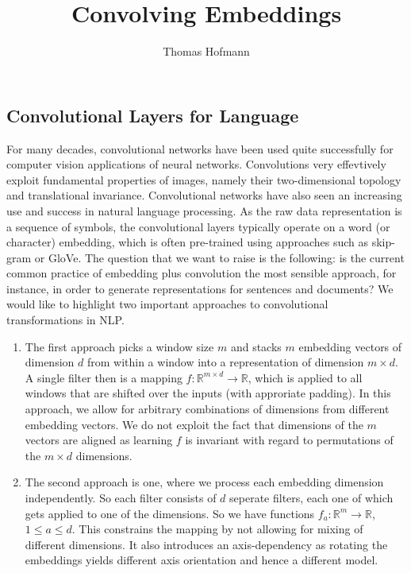 \documentclass{article}
\title{Convolving Embeddings}
\author{Thomas Hofmann}
\renewcommand{\Re}{{\mathbb R}}
\begin{document}
\maketitle 

\subsection*{Convolutional Layers for Language}

For many decades, convolutional networks have been used quite successfully for computer vision applications of neural networks. Convolutions very effevtively exploit fundamental properties of images, namely their two-dimensional topology and translational invariance. Convolutional networks have also seen an increasing use and success in natural language processing. As the raw data representation is a sequence of symbols, the convolutional layers typically operate on a word (or character) embedding, which is often pre-trained using approaches such as skip-gram or GloVe.  The question that we want to raise is the following: is the current common practice of embedding plus convolution the most sensible approach, for instance, in order to generate representations for sentences and documents? We would like to highlight two important approaches to convolutional transformations in NLP.
\begin{enumerate}
\item The first approach picks a window size $m$ and stacks $m$ embedding vectors of dimension $d$ from within a window into a representation of dimension $m \times d$. A single filter then is a mapping $f: \Re^{m \times d} \to \Re$, which is applied to all windows that are shifted over the inputs (with approriate padding). In this approach, we allow for arbitrary combinations of dimensions from different embedding vectors. We do not exploit the fact that dimensions of the $m$ vectors are aligned as learning $f$ is invariant with regard to permutations of the $m \times d$ dimensions. 
\item  The second approach is one, where we process each embedding dimension independently. So each filter consists of $d$ seperate filters, each one of which gets applied to one of the dimensions. So we have functions $f_a: \Re^m \to \Re$, $1 \leq a \leq d$. This constrains the mapping by not allowing for mixing of different dimensions. It also introduces an axis-dependency as rotating the embeddings yields different axis orientation and hence a different model.
\end{enumerate}
\end{document}
